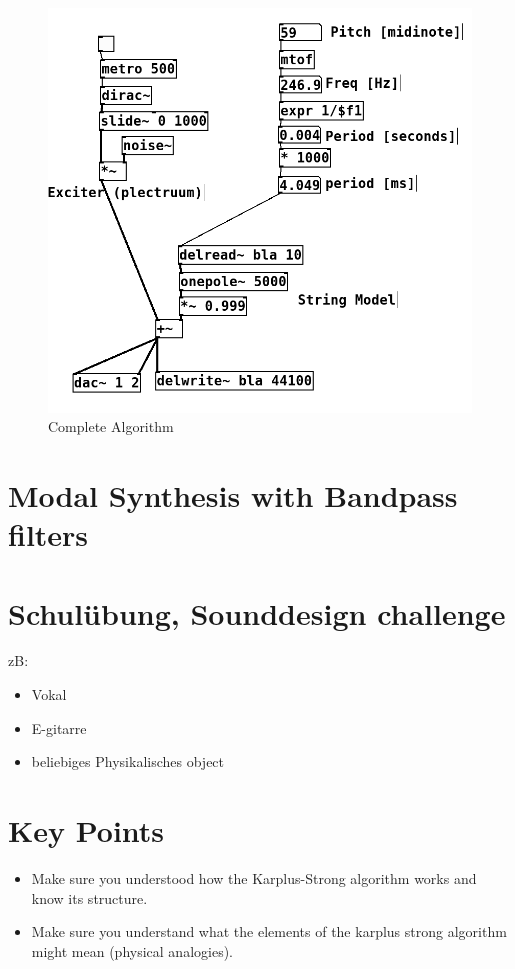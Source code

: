 \begin{figure}[H]
  \begin{center}
    \includegraphics[scale = 0.3]{img/karplusComplete.png}
    \caption{Complete Algorithm}
    \label{fig:karplusComplete}
  \end{center}
\end{figure}



\section{Modal Synthesis with Bandpass filters}


\section{Schulübung, Sounddesign challenge}

zB:
\begin{itemize}
	\item Vokal
	\item E-gitarre
	\item beliebiges Physikalisches object

\end{itemize}

\section{Key Points}
\begin{itemize}
  \item Make sure you understood how the Karplus-Strong algorithm works and know its structure.
  \item Make sure you understand what the elements of the karplus strong algorithm might mean (physical analogies).
\end{itemize}



